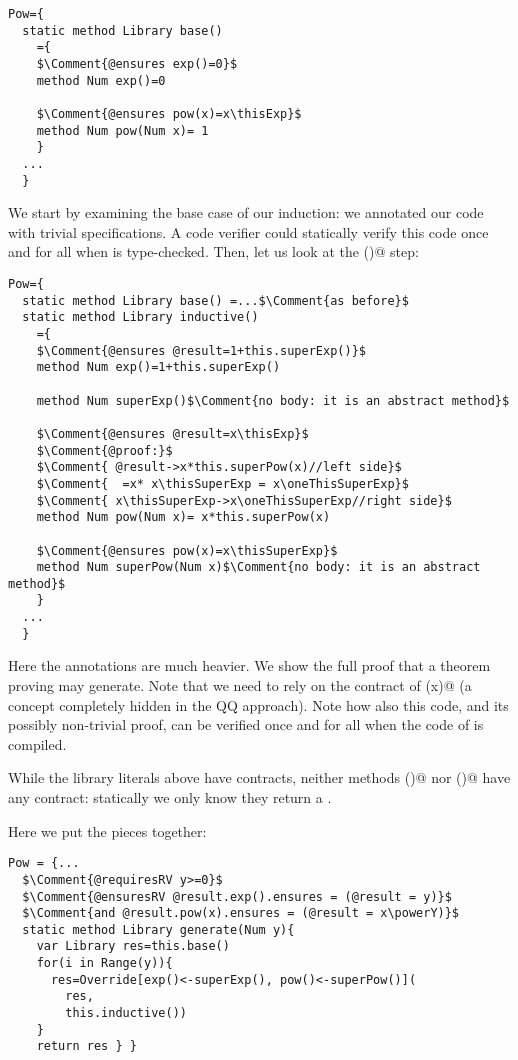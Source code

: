 \begin{lstlisting}
Pow={
  static method Library base()
    ={
    $\Comment{@ensures exp()=0}$
    method Num exp()=0 
    
    $\Comment{@ensures pow(x)=x\thisExp}$
    method Num pow(Num x)= 1 
    }
  ...
  }
\end{lstlisting}


\noindent
We start by examining the base case of our induction: we annotated our 
code with trivial specifications.
A code verifier could statically verify this code 
once and for all when \Q@Pow@ is type-checked.
Then, let us look at the \Q@inductive()@ step:

\begin{lstlisting}
Pow={
  static method Library base() =...$\Comment{as before}$
  static method Library inductive() 
    ={
    $\Comment{@ensures @result=1+this.superExp()}$
    method Num exp()=1+this.superExp() 
      
    method Num superExp()$\Comment{no body: it is an abstract method}$
      
    $\Comment{@ensures @result=x\thisExp}$
    $\Comment{@proof:}$
    $\Comment{ @result->x*this.superPow(x)//left side}$
    $\Comment{  =x* x\thisSuperExp = x\oneThisSuperExp}$
    $\Comment{ x\thisSuperExp->x\oneThisSuperExp//right side}$
    method Num pow(Num x)= x*this.superPow(x)
      
    $\Comment{@ensures pow(x)=x\thisSuperExp}$
    method Num superPow(Num x)$\Comment{no body: it is an abstract method}$
    }
  ...
  }
\end{lstlisting}

Here the annotations are much heavier.
We show the full proof that a theorem proving may generate.
Note that we need to rely on the contract of \Q@superPow(x)@ (a concept completely hidden in the QQ approach).
Note how also this code, and its possibly non-trivial proof, can be verified once and for all when the code of \Q@Pow@ is compiled.

While the library literals above have contracts,
neither methods \Q@base()@ nor \Q@inductive()@ have any contract:
statically we only know they return a \Q@Library@.

\noindent
Here we put the pieces together:

\begin{lstlisting}
Pow = {...
  $\Comment{@requiresRV y>=0}$
  $\Comment{@ensuresRV @result.exp().ensures = (@result = y)}$
  $\Comment{and @result.pow(x).ensures = (@result = x\powerY)}$
  static method Library generate(Num y){
    var Library res=this.base()
    for(i in Range(y)){
      res=Override[exp()<-superExp(), pow()<-superPow()](
        res,
        this.inductive())
    }
    return res } }
\end{lstlisting}

